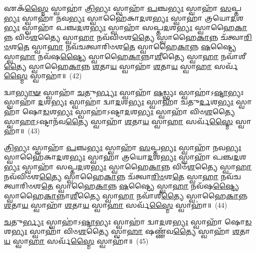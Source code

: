 {\anuvakamend[{𑌨𑌵᳴𑌚𑌤𑍍𑌵𑌾𑌰𑌿𑍞𑌶\-\ul{𑌤𑍇} 𑌸𑍍𑌵𑌾𑌹𑍈\-\ul{𑌕𑌾}\-𑌨𑍍𑌨𑍈𑌕᳴𑌵𑌿𑍞𑌶𑌤𑌿𑌶𑍍𑌚}]}%

𑌏𑌕᳴\-\ul{𑌸𑍍𑌮𑍈} 𑌸𑍍𑌵𑌾𑌹𑌾॑ \ul{𑌤𑍍𑌰𑌿}\-𑌭𑍍𑌯𑌃 𑌸𑍍𑌵𑌾𑌹𑌾᳴ \ul{𑌪}\-𑌞𑍍𑌚\-\ul{𑌭𑍍𑌯𑌃} 𑌸𑍍𑌵𑌾𑌹𑌾᳴ \ul{𑌸}\-𑌪𑍍𑌤\-\ul{𑌭𑍍𑌯𑌃} 𑌸𑍍𑌵𑌾𑌹𑌾᳴ \ul{𑌨}\-𑌵\-\ul{𑌭𑍍𑌯𑌃} 𑌸𑍍𑌵𑌾𑌹𑍈᳴𑌕𑌾\-\ul{𑌦}\-𑌶\-\ul{𑌭𑍍𑌯𑌃} 𑌸𑍍𑌵𑌾𑌹𑌾॑ 𑌤𑍍𑌰𑌯𑍋\-\ul{𑌦}\-𑌶\-\ul{𑌭𑍍𑌯𑌃} 𑌸𑍍𑌵𑌾𑌹𑌾᳴ 𑌪𑌞𑍍𑌚\-\ul{𑌦}\-𑌶\-\ul{𑌭𑍍𑌯𑌃} 𑌸𑍍𑌵𑌾𑌹𑌾᳴ 𑌸𑌪𑍍𑌤\-\ul{𑌦}\-𑌶\-\ul{𑌭𑍍𑌯𑌃} 𑌸𑍍𑌵𑌾𑌹𑍈\-\ul{𑌕𑌾}\-𑌨𑍍𑌨 𑌵𑌿𑍞᳴\-\ul{𑌶}\-𑌤𑍍𑌯𑍈 𑌸𑍍𑌵𑌾\-\ul{𑌹𑌾} 𑌨𑌵᳴𑌵𑌿𑍞𑌶\-\ul{𑌤𑍍𑌯𑍈} 𑌸𑍍𑌵𑌾𑌹𑍈\-\ul{𑌕𑌾}\-𑌨𑍍𑌨 𑌚᳴𑌤𑍍𑌵𑌾\-\ul{𑌰𑌿}\-\-\ul{𑍞}\-𑌶\-\ul{𑌤𑍇} 𑌸𑍍𑌵𑌾\-\ul{𑌹𑌾} 𑌨𑌵᳴𑌚𑌤𑍍𑌵𑌾𑌰𑌿𑍞𑌶\-\ul{𑌤𑍇} 𑌸𑍍𑌵𑌾𑌹𑍈\-\ul{𑌕𑌾}\-𑌨𑍍𑌨 \ul{𑌷}\-𑌷𑍍𑌟𑍍𑌯𑍈 𑌸𑍍𑌵𑌾\-\ul{𑌹𑌾} 𑌨𑌵᳴𑌷\-\ul{𑌷𑍍𑌟𑍍𑌯𑍈} 𑌸𑍍𑌵𑌾𑌹𑍈\-\ul{𑌕𑌾}\-𑌨𑍍𑌨𑌾\-\ul{𑌶𑍀}\-𑌤𑍍𑌯𑍈 𑌸𑍍𑌵𑌾\-\ul{𑌹𑌾} 𑌨𑌵𑌾᳴𑌶𑍀\-\ul{𑌤𑍍𑌯𑍈} 𑌸𑍍𑌵𑌾𑌹𑍈\-\ul{𑌕𑌾}\-𑌨𑍍𑌨 \ul{𑌶}\-𑌤𑌾\-\ul{𑌯} 𑌸𑍍𑌵𑌾𑌹𑌾᳴ \ul{𑌶}\-𑌤𑌾\-\ul{𑌯} 𑌸𑍍𑌵𑌾\-\ul{𑌹𑌾} 𑌸𑌰𑍍𑌵᳴\-\ul{𑌸𑍍𑌮𑍈} 𑌸𑍍𑌵𑌾𑌹𑌾॑॥~(42)

{\anuvakamend[{𑌏𑌕᳴𑌸𑍍𑌮𑍈 \ul{𑌤𑍍𑌰𑌿}\-𑌭𑍍𑌯𑌃 𑌪᳴\-\ul{𑌞𑍍𑌚𑌾}\-𑌶𑌤𑍍}]}%

𑌦𑍍𑌵𑌾\-\ul{𑌭𑍍𑌯𑌾}\-\-\ul{𑍟} 𑌸𑍍𑌵𑌾𑌹𑌾᳴ \ul{𑌚}\-𑌤𑍁\-\ul{𑌰𑍍𑌭𑍍𑌯𑌃} 𑌸𑍍𑌵𑌾𑌹𑌾᳴ \ul{𑌷}\-𑌡𑍍𑌭𑍍𑌯𑌃 𑌸𑍍𑌵𑌾𑌹𑌾॑\-𑌽\-\ul{𑌷𑍍𑌟𑌾}\-𑌭𑍍𑌯𑌃 𑌸𑍍𑌵𑌾𑌹𑌾᳴ \ul{𑌦}\-𑌶\-\ul{𑌭𑍍𑌯𑌃} 𑌸𑍍𑌵𑌾𑌹𑌾॑ 𑌦𑍍𑌵𑌾\-\ul{𑌦}\-𑌶\-\ul{𑌭𑍍𑌯𑌃} 𑌸𑍍𑌵𑌾𑌹𑌾᳴ 𑌚𑌤𑍁\-\ul{𑌰𑍍𑌦}\-𑌶\-\ul{𑌭𑍍𑌯𑌃} 𑌸𑍍𑌵𑌾𑌹𑌾᳴ 𑌷𑍋\-\ul{𑌡}\-𑌶\-\ul{𑌭𑍍𑌯𑌃} 𑌸𑍍𑌵𑌾𑌹𑌾॑\-𑌽𑌷𑍍𑌟𑌾\-\ul{𑌦}\-𑌶\-\ul{𑌭𑍍𑌯𑌃} 𑌸𑍍𑌵𑌾𑌹𑌾᳴ 𑌵𑌿𑍞\-\ul{𑌶}\-𑌤𑍍𑌯𑍈 𑌸𑍍𑌵𑌾\-\ul{𑌹𑌾}\-\-𑌽𑌷𑍍𑌟𑌾𑌨᳴𑌵\-\ul{𑌤𑍍𑌯𑍈} 𑌸𑍍𑌵𑌾𑌹𑌾᳴ \ul{𑌶}\-𑌤𑌾\-\ul{𑌯} 𑌸𑍍𑌵𑌾\-\ul{𑌹𑌾} 𑌸𑌰𑍍𑌵᳴\-\ul{𑌸𑍍𑌮𑍈} 𑌸𑍍𑌵𑌾𑌹𑌾॑॥~(43)

{\anuvakamend[{𑌦𑍍𑌵𑌾𑌭𑍍𑌯𑌾᳴\-\ul{𑌮}\-𑌷𑍍𑌟𑌾𑌨᳴𑌵\-\ul{𑌤𑍍𑌯𑍈} 𑌷𑌡𑍍𑌵𑌿𑍞᳴𑌶𑌤𑌿𑌃}]}%

\-\ul{𑌤𑍍𑌰𑌿}\-𑌭𑍍𑌯𑌃 𑌸𑍍𑌵𑌾𑌹𑌾᳴ \ul{𑌪}\-𑌞𑍍𑌚\-\ul{𑌭𑍍𑌯𑌃} 𑌸𑍍𑌵𑌾𑌹𑌾᳴ \ul{𑌸}\-𑌪𑍍𑌤\-\ul{𑌭𑍍𑌯𑌃} 𑌸𑍍𑌵𑌾𑌹𑌾᳴ \ul{𑌨}\-𑌵\-\ul{𑌭𑍍𑌯𑌃} 𑌸𑍍𑌵𑌾𑌹𑍈᳴𑌕𑌾\-\ul{𑌦}\-𑌶\-\ul{𑌭𑍍𑌯𑌃} 𑌸𑍍𑌵𑌾𑌹𑌾॑ 𑌤𑍍𑌰𑌯𑍋\-\ul{𑌦}\-𑌶\-\ul{𑌭𑍍𑌯𑌃} 𑌸𑍍𑌵𑌾𑌹𑌾᳴ 𑌪𑌞𑍍𑌚\-\ul{𑌦}\-𑌶\-\ul{𑌭𑍍𑌯𑌃} 𑌸𑍍𑌵𑌾𑌹𑌾᳴ 𑌸𑌪𑍍𑌤\-\ul{𑌦}\-𑌶\-\ul{𑌭𑍍𑌯𑌃} 𑌸𑍍𑌵𑌾𑌹𑍈\-\ul{𑌕𑌾}\-𑌨𑍍𑌨 𑌵𑌿𑍞᳴\-\ul{𑌶}\-𑌤𑍍𑌯𑍈 𑌸𑍍𑌵𑌾\-\ul{𑌹𑌾} 𑌨𑌵᳴𑌵𑌿𑍞𑌶\-\ul{𑌤𑍍𑌯𑍈} 𑌸𑍍𑌵𑌾𑌹𑍈\-\ul{𑌕𑌾}\-𑌨𑍍𑌨 𑌚᳴𑌤𑍍𑌵𑌾\-\ul{𑌰𑌿}\-\-\ul{𑍞}\-𑌶\-\ul{𑌤𑍇} 𑌸𑍍𑌵𑌾\-\ul{𑌹𑌾} 𑌨𑌵᳴𑌚𑌤𑍍𑌵𑌾𑌰𑌿𑍞𑌶\-\ul{𑌤𑍇} 𑌸𑍍𑌵𑌾𑌹𑍈\-\ul{𑌕𑌾}\-𑌨𑍍𑌨 \ul{𑌷}\-𑌷𑍍𑌟𑍍𑌯𑍈 𑌸𑍍𑌵𑌾\-\ul{𑌹𑌾} 𑌨𑌵᳴𑌷\-\ul{𑌷𑍍𑌟𑍍𑌯𑍈} 𑌸𑍍𑌵𑌾𑌹𑍈\-\ul{𑌕𑌾}\-𑌨𑍍𑌨𑌾\-\ul{𑌶𑍀}\-𑌤𑍍𑌯𑍈 𑌸𑍍𑌵𑌾\-\ul{𑌹𑌾} 𑌨𑌵𑌾᳴𑌶𑍀\-\ul{𑌤𑍍𑌯𑍈} 𑌸𑍍𑌵𑌾𑌹𑍈\-\ul{𑌕𑌾}\-𑌨𑍍𑌨 \ul{𑌶}\-𑌤𑌾\-\ul{𑌯} 𑌸𑍍𑌵𑌾𑌹𑌾᳴ \ul{𑌶}\-𑌤𑌾\-\ul{𑌯} 𑌸𑍍𑌵𑌾\-\ul{𑌹𑌾} 𑌸𑌰𑍍𑌵᳴\-\ul{𑌸𑍍𑌮𑍈} 𑌸𑍍𑌵𑌾𑌹𑌾॑॥~(44)

{\anuvakamend[{\-\ul{𑌤𑍍𑌰𑌿}\-𑌭𑍍𑌯𑍋॑\-𑌽𑌷𑍍𑌟𑌾𑌚𑌤𑍍𑌵𑌾\-\ul{𑌰𑌿}\-\-\ul{𑍞}\-𑌶𑌤𑍍}]}%

\-\ul{𑌚}\-𑌤𑍁\-\ul{𑌰𑍍𑌭𑍍𑌯𑌃} 𑌸𑍍𑌵𑌾𑌹𑌾॑\-𑌽\-\ul{𑌷𑍍𑌟𑌾}\-𑌭𑍍𑌯𑌃 𑌸𑍍𑌵𑌾𑌹𑌾॑ 𑌦𑍍𑌵𑌾\-\ul{𑌦}\-𑌶\-\ul{𑌭𑍍𑌯𑌃} 𑌸𑍍𑌵𑌾𑌹𑌾᳴ 𑌷𑍋\-\ul{𑌡}\-𑌶\-\ul{𑌭𑍍𑌯𑌃} 𑌸𑍍𑌵𑌾𑌹𑌾᳴ 𑌵𑌿𑍞\-\ul{𑌶}\-𑌤𑍍𑌯𑍈 𑌸𑍍𑌵𑌾\-\ul{𑌹𑌾} 𑌷𑌣𑍍𑌣᳴𑌵\-\ul{𑌤𑍍𑌯𑍈} 𑌸𑍍𑌵𑌾𑌹𑌾᳴ \ul{𑌶}\-𑌤𑌾\-\ul{𑌯} 𑌸𑍍𑌵𑌾\-\ul{𑌹𑌾} 𑌸𑌰𑍍𑌵᳴\-\ul{𑌸𑍍𑌮𑍈} 𑌸𑍍𑌵𑌾𑌹𑌾॑॥~(45)

